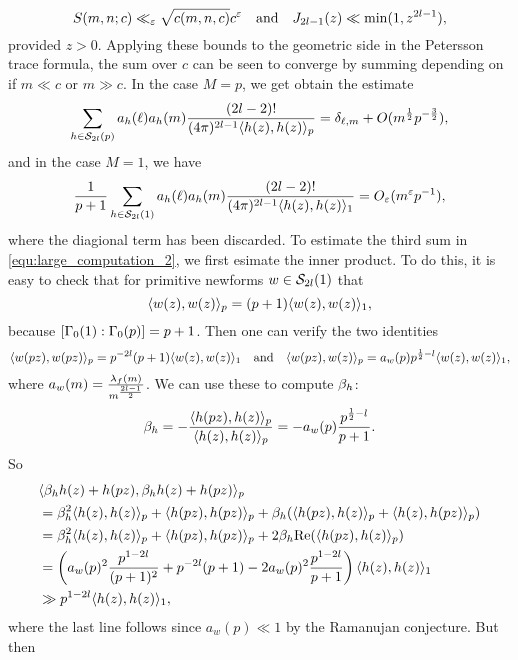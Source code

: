 \documentclass[12pt,reqno,oneside]{amsart}
\begin{document}
    \[
        S(m,n;c) \ll_{\varepsilon} \sqrt{c(m,n,c)}c^{\varepsilon} \quad \text{and} \quad J_{2l-1}(z) \ll \min(1,z^{2l-1}),
    \]
    provided $z > 0$. Applying these bounds to the geometric side in the Petersson trace formula, the sum over $c$ can be seen to converge by summing depending on if $m \ll c$ or $m \gg c$. In the case $M = p$, we get obtain the estimate
    \begin{equation}\label{equ:Petersson_trace_estimate_1}
        \sum_{h \in \mathcal{S}_{2l}(p)}a_{h}(\ell)a_{h}(m)\frac{(2l-2)!}{(4\pi)^{2l-1}\langle h(z),h(z)\rangle_{p}} = \delta_{\ell,m}+O(m^{\frac{1}{2}}p^{-\frac{3}{2}}),
    \end{equation}
    and in the case $M = 1$, we have
    \begin{equation}\label{equ:Petersson_trace_estimate_2}
        \frac{1}{p+1}\sum_{h \in \mathcal{S}_{2l}(1)}a_{h}(\ell)a_{h}(m)\frac{(2l-2)!}{(4\pi)^{2l-1}\langle h(z),h(z)\rangle_{1}} = O_{\varepsilon}(m^{\varepsilon}p^{-1}),
    \end{equation}
    where the diagional term has been discarded. To estimate the third sum in \cref{equ:large_computation_2}, we first esimate the inner product. To do this, it is easy to check that for primitive newforms $w \in \mathcal{S}_{2l}(1)$ that
    \[
        \langle w(z),w(z)\rangle_{p} = (p+1)\langle w(z),w(z)\rangle_{1},
    \]
    because $[\Gamma_{0}(1):\Gamma_{0}(p)] = p+1$. Then one can verify the two identities
    \[
        \langle w(pz),w(pz)\rangle_{p} = p^{-2l}(p+1)\langle w(z),w(z)\rangle_{1} \quad \text{and} \quad \langle w(pz),w(z)\rangle_{p} = a_{w}(p)p^{\frac{1}{2}-l}\langle w(z),w(z)\rangle_{1},
    \]
    where $a_{w}(m) = \frac{\lambda_{f}(m)}{m^{\frac{2l-1}{2}}}$. We can use these to compute $\beta_{h}$:
    \[
        \beta_{h} = -\frac{\langle h(pz),h(z)\rangle_{p}}{\langle h(z),h(z)\rangle_{p}} = -a_{w}(p)\frac{p^{\frac{1}{2}-l}}{p+1}.
    \]
    So
    \begin{align*}
        &\langle\beta_{h}h(z)+h(pz),\beta_{h}h(z)+h(pz)\rangle_{p} \\
        &= \beta_{h}^{2}\langle h(z),h(z)\rangle_{p}+\langle h(pz),h(pz)\rangle_{p}+\beta_{h}(\langle h(pz),h(z)\rangle_{p}+\langle h(z),h(pz)\rangle_{p}) \\
        &= \beta_{h}^{2}\langle h(z),h(z)\rangle_{p}+\langle h(pz),h(pz)\rangle_{p}+2\beta_{h}\mathrm{Re}(\langle h(pz),h(z)\rangle_{p}) \\
        &= \left(a_{w}(p)^{2}\frac{p^{1-2l}}{(p+1)^{2}}+p^{-2l}(p+1)-2a_{w}(p)^{2}\frac{p^{1-2l}}{p+1}\right)\langle h(z),h(z)\rangle_{1} \\
        &\gg p^{1-2l}\langle h(z),h(z)\rangle_{1},
    \end{align*}
    where the last line follows since $a_{w}(p) \ll 1$ by the Ramanujan conjecture. But then
\end{document}
